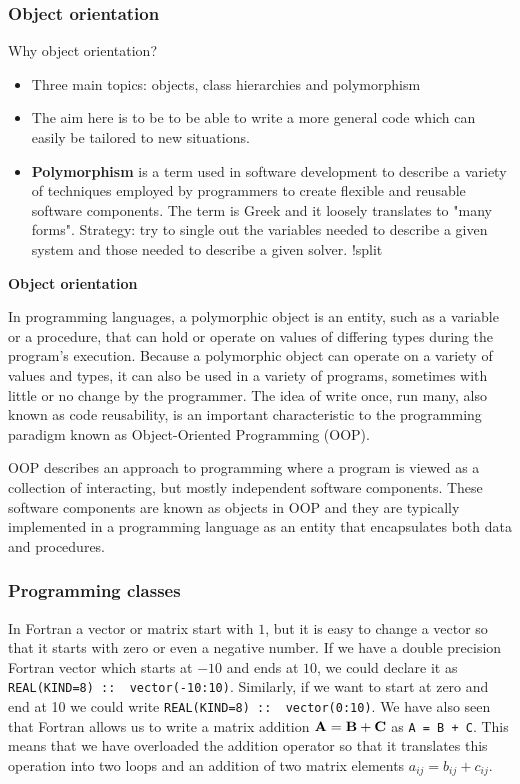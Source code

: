 \documentclass{beamer}
\begin{document}
\begin{frame}
\frametitle{Object orientation}

Why object orientation?

\begin{itemize}
  \item Three main topics: objects, class hierarchies and polymorphism

  \item The aim here is to be to be able to write a more general code which can easily be tailored to new situations.

  \item {\bf Polymorphism} is a term used in software development to describe a variety of techniques employed by programmers to create flexible and reusable software components. The term is Greek and it loosely translates to "many forms". Strategy: try to single out the variables needed to describe a given system and those needed to describe a given solver. !split
\end{itemize}

\noindent
\noindent\textbf{\large Object orientation}

In programming languages, a polymorphic object is an entity, such as a variable or a procedure, that can hold or operate on values of differing types during the program's execution. Because a polymorphic object can operate on a variety of values and types, it can also be used in a variety of programs, sometimes with little or no change by the programmer. The idea of write once, run many, also known as code reusability, is an important characteristic to the programming paradigm known as Object-Oriented Programming (OOP).

OOP describes an approach to programming where a program is viewed as a collection of interacting, but mostly independent software components. These software components are known as objects in OOP and they are typically implemented in a programming language as an entity that encapsulates both data and procedures.
\end{frame}

\begin{frame}
\frametitle{Programming classes}

In Fortran a vector or matrix start with $1$, but it is easy
to change a vector so that it starts with zero or even a negative number.
If we have a double precision Fortran vector  which starts at $-10$ and ends at $10$, we could declare it as
\Verb!REAL(KIND=8) ::  vector(-10:10)!. Similarly, if we want to start at zero and end at 10 we could write
\Verb!REAL(KIND=8) ::  vector(0:10)!.
We have also seen that Fortran  allows us to write a matrix addition ${\bf A} = {\bf B}+{\bf C}$ as
\Verb!A = B + C!.  This means that we have overloaded the addition operator so that it translates this operation into
two loops and an addition of two matrix elements $a_{ij} = b_{ij}+c_{ij}$.
\end{frame}
\end{document}

